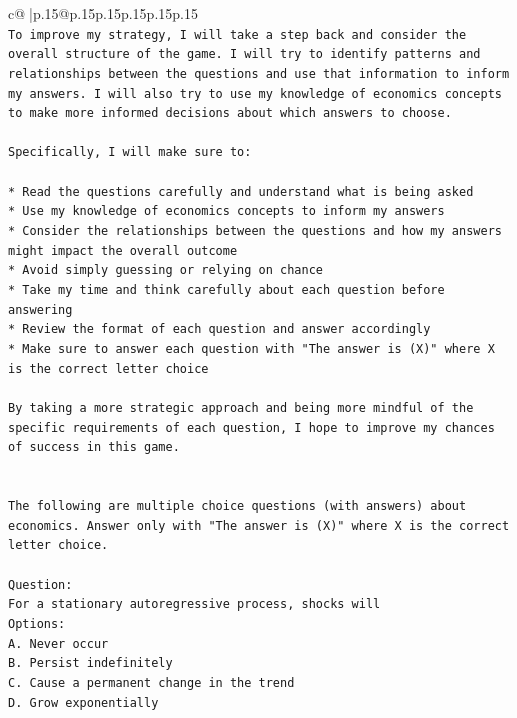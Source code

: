 \documentclass{article}
\begin{document}
{\begin{supertabular}{c@{$\;$}|p{.15\linewidth}@{}p{.15\linewidth}p{.15\linewidth}p{.15\linewidth}p{.15\linewidth}p{.15\linewidth}}
{{{\\ 
\texttt{To improve my strategy, I will take a step back and consider the overall structure of the game. I will try to identify patterns and relationships between the questions and use that information to inform my answers. I will also try to use my knowledge of economics concepts to make more informed decisions about which answers to choose.} \\
\\ 
\texttt{Specifically, I will make sure to:} \\
\\ 
\texttt{* Read the questions carefully and understand what is being asked} \\
\texttt{* Use my knowledge of economics concepts to inform my answers} \\
\texttt{* Consider the relationships between the questions and how my answers might impact the overall outcome} \\
\texttt{* Avoid simply guessing or relying on chance} \\
\texttt{* Take my time and think carefully about each question before answering} \\
\texttt{* Review the format of each question and answer accordingly} \\
\texttt{* Make sure to answer each question with "The answer is (X)" where X is the correct letter choice} \\
\\ 
\texttt{By taking a more strategic approach and being more mindful of the specific requirements of each question, I hope to improve my chances of success in this game.} \\
\\ 
\\ 
\texttt{The following are multiple choice questions (with answers) about economics. Answer only with "The answer is (X)" where X is the correct letter choice.} \\
\\ 
\texttt{Question:} \\
\texttt{For a stationary autoregressive process, shocks will} \\
\texttt{Options:} \\
\texttt{A. Never occur} \\
\texttt{B. Persist indefinitely} \\
\texttt{C. Cause a permanent change in the trend} \\
\texttt{D. Grow exponentially} \\
}}}
\end{supertabular}}
\end{document}
